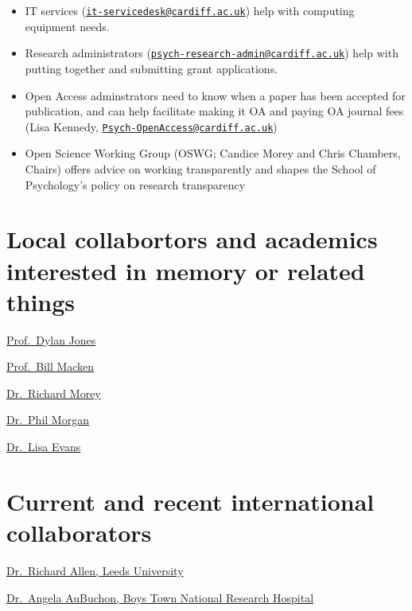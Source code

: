 \documentclass[12pt,]{book}
\theoremstyle{definition}
\theoremstyle{definition}
\theoremstyle{definition}
\theoremstyle{remark}
\begin{document}
\begin{itemize}
\item
  IT services
  (\href{mailto:it-servicedesk@cardiff.ac.uk}{\nolinkurl{it-servicedesk@cardiff.ac.uk}})
  help with computing equipment needs.
\item
  Research administrators
  (\href{mailto:psych-research-admin@cardiff.ac.uk}{\nolinkurl{psych-research-admin@cardiff.ac.uk}})
  help with putting together and submitting grant applications.
\item
  Open Access adminstrators need to know when a paper has been accepted
  for publication, and can help facilitate making it OA and paying OA
  journal fees (Lisa Kennedy,
  \href{mailto:Psych-OpenAccess@cardiff.ac.uk}{\nolinkurl{Psych-OpenAccess@cardiff.ac.uk}})
\item
  Open Science Working Group (OSWG; Candice Morey and Chris Chambers,
  Chairs) offers advice on working transparently and shapes the School
  of Psychology's policy on research transparency
\end{itemize}

\section{Local collabortors and academics interested in memory or
related
things}\label{local-collabortors-and-academics-interested-in-memory-or-related-things}

\href{http://psych.cf.ac.uk/contactsandpeople/jonesdm.php}{Prof.~Dylan
Jones}

\href{http://psych.cf.ac.uk/contactsandpeople/macken.php}{Prof.~Bill
Macken}

\href{http://psych.cf.ac.uk/contactsandpeople/moreyr.php}{Dr.~Richard
Morey}

\href{http://psych.cf.ac.uk/contactsandpeople/morganphil.php}{Dr.~Phil
Morgan}

\href{http://psych.cf.ac.uk/contactsandpeople/evanslh.php}{Dr.~Lisa
Evans}

\section{Current and recent international
collaborators}\label{current-and-recent-international-collaborators}

\href{https://medhealth.leeds.ac.uk/profile/1300/958/richard_allen}{Dr.~Richard
Allen, Leeds University}

\href{https://www.boystownhospital.org/research/Faculty/Pages/Angela-AuBuchon.aspx}{Dr.~Angela
AuBuchon, Boys Town National Research Hospital}
\end{document}
